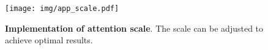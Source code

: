 \begin{figure}[b]
    \centering
    \texttt{[image: img/app\_scale.pdf]}
        \caption{\textbf{Implementation of attention scale}. The scale can be adjusted to achieve optimal results.}
    \label{fig:app_scale}
    \vspace{-10pt}
\end{figure}

